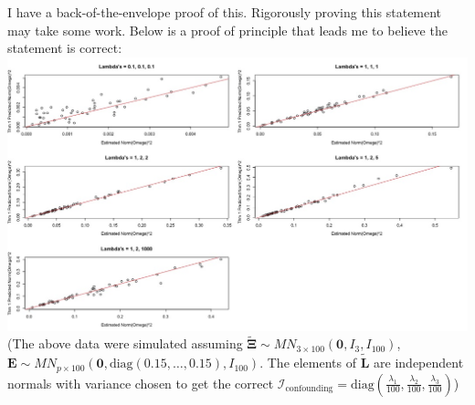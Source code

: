 \documentclass{article}
\begin{document}
I have a back-of-the-envelope proof of this. Rigorously proving this statement may take some work. Below is a proof of principle that leads me to believe the statement is correct:\\
\includegraphics[scale=0.4]{UnderestimatingOmega_Multipliers_Theorem.jpeg}\\
(The above data were simulated assuming $\tilde{\bm{\Xi}} \sim MN_{3 \times 100}\left( \bm{0}, I_3, I_{100} \right)$, $\bm{E} \sim MN_{p \times 100}\left( \bm{0}, \text{diag}\left( 0.15, \ldots, 0.15 \right), I_{100} \right)$. The elements of $\tilde{\bm{L}}$ are independent normals with variance chosen to get the correct $\mathcal{I}_{\text{confounding}} = \text{diag}\left( \frac{\lambda_1}{100}, \frac{\lambda_2}{100}, \frac{\lambda_3}{100} \right)$)
\end{document}
